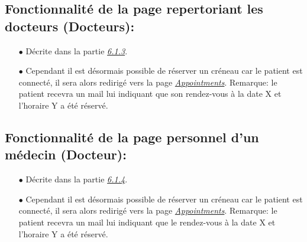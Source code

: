 \documentclass[a4paper]{report}
\begin{document}
\subsection{Fonctionnalité de la page repertoriant les docteurs (Docteurs):}\label{docteurs2}
    \begin{itemize}
        \item[$\bullet$] Décrite dans la partie \textit{\hyperref[docteurs]{6.1.3}}.
        \item[$\bullet$] Cependant il est désormais possible de réserver un créneau car le patient est connecté, il sera alors redirigé vers la page \textit{\hyperref[appointments]{Appointments}}. {\fontsize{8}{14}\selectfont Remarque: le patient recevra un mail lui indiquant que son rendez-vous à la date X et l’horaire Y a été réservé}.
    \end{itemize}
    \vspace{3mm}

\subsection{Fonctionnalité de la page personnel d'un médecin (Docteur):}\label{docteur2}
    \begin{itemize}
        \item[$\bullet$] Décrite dans la partie \textit{\hyperref[docteur]{6.1.4}}.
        \item[$\bullet$] Cependant il est désormais possible de réserver un créneau car le patient est connecté, il sera alors redirigé vers la page \textit{\hyperref[appointments]{Appointments}}. {\fontsize{8}{14}\selectfont Remarque: le patient recevra un mail lui indiquant que le rendez-vous à la date X et l’horaire Y a été réservé}.
    \end{itemize}
    \vspace{3mm}
\end{document}
